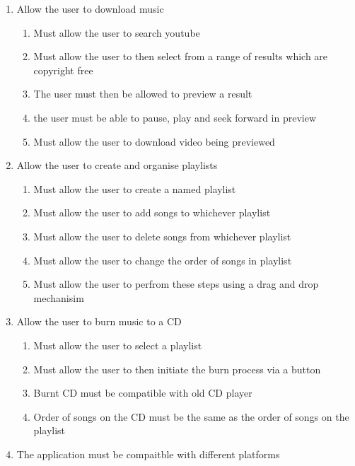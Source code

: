 \documentclass{article}
\begin{document}
\begin{enumerate}
    \item Allow the user to download music

    \begin{enumerate}
        \item Must allow the user to search youtube
        \item Must allow the user to then select from a range of results which are copyright free
        \item The user must then be allowed to preview a result
        \item the user must be able to pause, play and seek forward in preview
        \item Must allow the user to download video being previewed
    \end{enumerate}

    \item Allow the user to create and organise playlists

    \begin{enumerate}
        \item Must allow the user to create a named playlist
        \item Must allow the user to add songs to whichever playlist
        \item Must allow the user to delete songs from whichever playlist
        \item Must allow the user to change the order of songs in playlist
        \item Must allow the user to perfrom these steps using a drag and drop mechanisim
    \end{enumerate}

    \item Allow the user to burn music to a CD

    \begin{enumerate}
        \item Must allow the user to select a playlist
        \item Must allow the user to then initiate the burn process via a button
        \item Burnt CD must be compatible with old CD player
        \item Order of songs on the CD must be the same as the order of songs on the playlist
    \end{enumerate}

    \item The application must be compaitble with different platforms

\end{enumerate}
\end{document}
